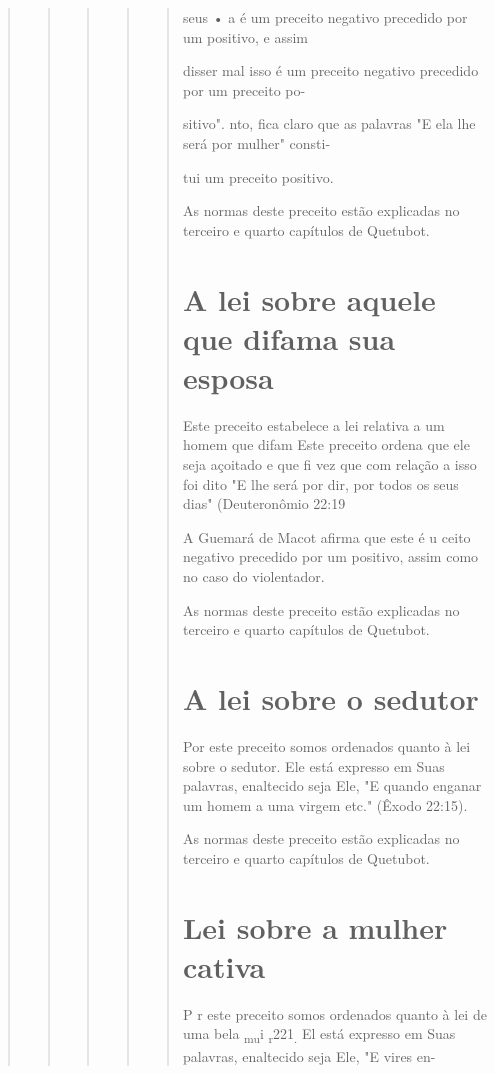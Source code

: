 \begin{quote}
\begin{quote}
\begin{quote}
\begin{quote}
\begin{quote}
seus • a é um preceito negativo precedido por um positivo, e assim

disser mal isso é um preceito negativo precedido por um preceito po-

sitivo". nto, fica claro que as palavras "E ela lhe será por mulher"
consti-

tui um preceito positivo.

As normas deste preceito estão explicadas no terceiro e quarto
capí­tulos de Quetubot.

\section{A lei sobre aquele que difama sua esposa}

Este preceito estabelece a lei relativa a um homem que difam Este
preceito ordena que ele seja açoitado e que fi vez que com relação a
isso foi dito "E lhe será por dir, por todos os seus dias" (Deuteronômio
22:19

A Guemará de Macot afirma que este é u ceito negativo precedido
por um positivo, assim como no caso do violentador.

As normas deste preceito estão explicadas no terceiro e quarto
capí­tulos de Quetubot.

\section{A lei sobre o sedutor}

Por este preceito somos ordenados quanto à lei sobre o sedutor. Ele está
expresso em Suas palavras, enaltecido seja Ele, "E quando enganar um
ho­mem a uma virgem etc." (Êxodo 22:15).

As normas deste preceito estão explicadas no terceiro e quarto
capí­tulos de Quetubot.

\section{Lei sobre a mulher cativa}

P r este preceito somos ordenados quanto à lei de uma bela
\textsubscript{mu}i \textsubscript{r}221\textsubscript{.} El está
expresso em Suas palavras, enaltecido seja Ele, "E vires en-
\end{quote}


\end{quote}
\end{quote}
\end{quote}
\end{quote}
